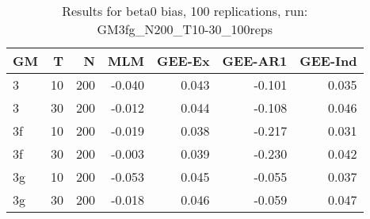 \begin{table}[ht]
\centering
\begin{tabular}{lrrrrrr}
  \hline
GM & T & N & MLM & GEE-Ex & GEE-AR1 & GEE-Ind \\ 
  \hline
3 & 10 & 200 & -0.040 & 0.043 & -0.101 & 0.035 \\ 
  3 & 30 & 200 & -0.012 & 0.044 & -0.108 & 0.046 \\ 
  3f & 10 & 200 & -0.019 & 0.038 & -0.217 & 0.031 \\ 
  3f & 30 & 200 & -0.003 & 0.039 & -0.230 & 0.042 \\ 
  3g & 10 & 200 & -0.053 & 0.045 & -0.055 & 0.037 \\ 
  3g & 30 & 200 & -0.018 & 0.046 & -0.059 & 0.047 \\ 
   \hline
\end{tabular}
\caption{Results for beta0 bias, 100 replications, run: GM3fg_N200_T10-30_100reps} 
\label{tab:beta0_bias}
\end{table}
